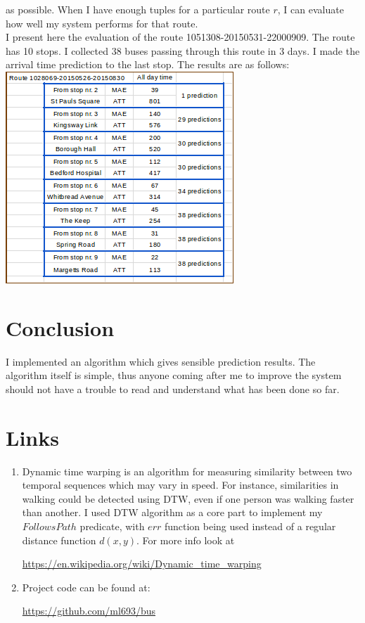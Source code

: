 \documentclass[12pt,a4paper,oneside,openright]{report}
\begin{document}
as possible. When I have enough tuples for a particular route $r$, I can evaluate
how well my system performs for that route. \\

I present here the evaluation of the route 1051308-20150531-22000909. The route has 10
stops. I collected $38$ buses passing through this route in 3 days. I made the arrival
time prediction to the last stop. The results are as follows: \\

\includegraphics[scale=1.0]{figs/table_of_1051308.png}

\chapter{Conclusion}

I implemented an algorithm which gives sensible prediction results. The
algorithm itself is simple, thus anyone coming after me to improve the
system should not have a trouble to read and understand what has been done so far. \\

\appendix

\chapter{Links}

\begin{enumerate}
\item Dynamic time warping is an algorithm for measuring similarity between
two temporal sequences which may vary in speed. For instance, similarities in
walking could be detected using DTW, even if one person was walking faster than
another. I used DTW algorithm as a core part to implement my $FollowsPath$
predicate, with $err$ function being used instead of a regular distance function 
$d(x, y)$.
For more info look at

\textcolor{blue}{\url{https://en.wikipedia.org/wiki/Dynamic_time_warping}}

\item Project code can be found at: 

\textcolor{blue}{\url{https://github.com/ml693/bus}}


\end{enumerate}
\end{document}
